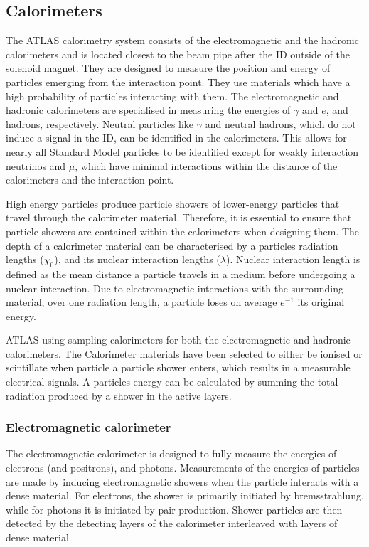 \subsection{Calorimeters}\label{sec:method:Cals}
The ATLAS calorimetry system consists of the electromagnetic and the hadronic calorimeters and is located closest to the beam pipe after the ID outside of the solenoid magnet. They are designed to measure the position and energy of particles emerging from the interaction point. They use materials which have a high probability of particles interacting with them. The electromagnetic and hadronic calorimeters are specialised in measuring the energies of $\gamma$ and $e$, and hadrons, respectively. Neutral particles like $\gamma$ and neutral hadrons, which do not induce a signal in the ID, can be identified in the calorimeters. This allows for nearly all Standard Model particles to be identified except for weakly interaction neutrinos and $\mu$, which have minimal interactions within the distance of the calorimeters and the interaction point. 

High energy particles produce particle showers of lower-energy particles that travel through the calorimeter material. Therefore, it is essential to ensure that particle showers are contained within the calorimeters when designing them. The depth of a calorimeter material can be characterised by a particles radiation lengths ($\chi_{0}$), and its nuclear interaction lengths ($\lambda$). Nuclear interaction length is defined as the mean distance a particle travels in a medium before undergoing a nuclear interaction. Due to electromagnetic interactions with the surrounding material, over one radiation length, a particle loses on average $e^{-1}$ its original energy. 

ATLAS using sampling calorimeters for both the electromagnetic and hadronic calorimeters. The Calorimeter materials have been selected to either be ionised or scintillate when particle a particle shower enters, which results in a measurable electrical signals. A particles energy can be calculated by summing the total radiation produced by a shower in the active layers. 

\subsubsection{Electromagnetic calorimeter}
The electromagnetic calorimeter is designed to fully measure the energies of electrons (and positrons), and photons. Measurements of the energies of particles are made by inducing electromagnetic showers when the particle interacts with a dense material. For electrons, the shower is primarily initiated by bremsstrahlung, while for photons it is initiated by pair production. Shower particles are then detected by the detecting layers of the calorimeter interleaved with layers of dense material.

